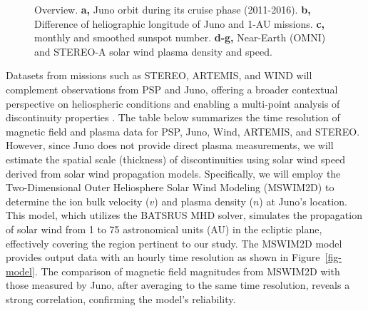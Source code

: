 \documentclass[
  letterpaper,
  DIV=11,
  numbers=noendperiod]{scrartcl}
\begin{document}
\begin{figure}


\caption{\label{fig-overview}Overview. \textbf{a,} Juno orbit during its cruise phase (2011-2016). \textbf{b,} Difference of heliographic longitude of Juno and 1-AU missions. \textbf{c,} monthly and smoothed sunspot number. \textbf{d-g,} Near-Earth (OMNI) and STEREO-A solar wind plasma density and speed.}

\end{figure}%

Datasets from missions such as STEREO, ARTEMIS, and WIND will complement observations from PSP and Juno, offering a broader contextual perspective on heliospheric conditions and enabling a multi-point analysis of discontinuity properties \citep{velliUnderstandingOriginsHeliosphere2020}. The table below summarizes the time resolution of magnetic field and plasma data for PSP, Juno, Wind, ARTEMIS, and STEREO. However, since Juno does not provide direct plasma measurements, we will estimate the spatial scale (thickness) of discontinuities using solar wind speed derived from solar wind propagation models. Specifically, we will employ the Two-Dimensional Outer Heliosphere Solar Wind Modeling (MSWIM2D) \citep{keeblerMSWIM2DTwodimensionalOuter2022} to determine the ion bulk velocity (\(v\)) and plasma density (\(n\)) at Juno's location. This model, which utilizes the BATSRUS MHD solver, simulates the propagation of solar wind from 1 to 75 astronomical units (AU) in the ecliptic plane, effectively covering the region pertinent to our study. The MSWIM2D model provides output data with an hourly time resolution as shown in Figure~\ref{fig-model}. The comparison of magnetic field magnitudes from MSWIM2D with those measured by Juno, after averaging to the same time resolution, reveals a strong correlation, confirming the model's reliability.
\end{document}
